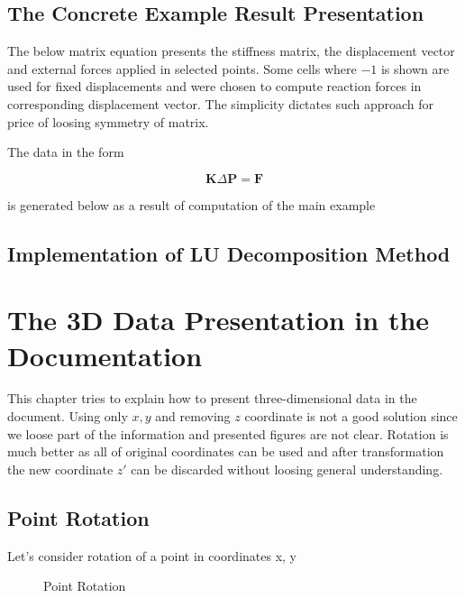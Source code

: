 \subsection{The Concrete Example Result Presentation}

The below matrix equation presents the stiffness matrix, the displacement vector and external forces applied in selected points. Some cells where $-1$ is shown are used for fixed displacements and were chosen to compute reaction forces in corresponding displacement vector. The simplicity dictates such approach for price of loosing symmetry of matrix.

\bigskip

The data in the form

\begin{equation}
\mathbf{K} \Delta \mathbf{P} = \mathbf{F}
\end{equation}

is generated below as a result of computation of the main example



\subsection{Implementation of LU Decomposition Method}



\section{The 3D Data Presentation in the Documentation}

This chapter tries to explain how to present three-dimensional data in the document. Using only $x,y$ and removing $z$ coordinate is not a good solution since we loose part of the information and presented figures are not clear. Rotation is much better as all of original coordinates can be used and after transformation the new coordinate $z'$ can be discarded without loosing general understanding.

\subsection{Point Rotation}

Let's consider rotation of a point in coordinates x, y

\begin{figure}[H]
\centering

\caption{Point Rotation}
\label{fig:point:rotation}
\end{figure}


